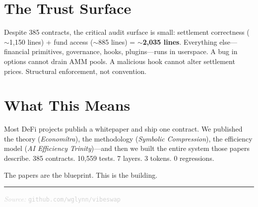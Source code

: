 \documentclass[10pt, letterpaper]{article}
\newcommand{\thinrule}{\vspace{2pt}\noindent\textcolor{rule}{\rule{\textwidth}{0.4pt}}\vspace{2pt}}
\begin{document}

\section{The Trust Surface}

Despite 385 contracts, the critical audit surface is small: settlement correctness ($\sim$1{,}150 lines) + fund access ($\sim$885 lines) = \textbf{$\sim$2{,}035 lines}. Everything else---financial primitives, governance, hooks, plugins---runs in userspace. A bug in options cannot drain AMM pools. A malicious hook cannot alter settlement prices. Structural enforcement, not convention.


\section{What This Means}

Most DeFi projects publish a whitepaper and ship one contract. We published the theory (\textit{Econom\'itra}), the methodology (\textit{Symbolic Compression}), the efficiency model (\textit{AI Efficiency Trinity})---and then we built the entire system those papers describe. 385 contracts. 10{,}559 tests. 7 layers. 3 tokens. 0 regressions.

The papers are the blueprint. This is the building.

\thinrule

\begin{center}
  \textcolor{lightgray}{\footnotesize\textit{Source:} \texttt{github.com/wglynn/vibeswap}}
\end{center}
\end{document}
